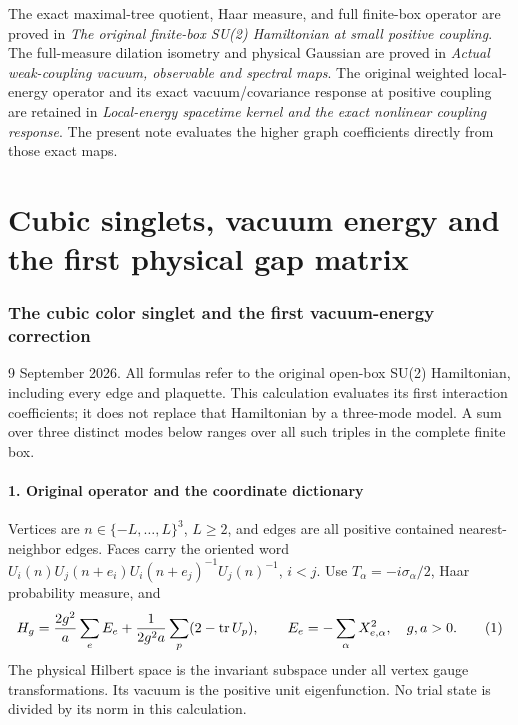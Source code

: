 \documentclass[
  11pt,
]{article}
\begin{document}
The exact maximal-tree quotient, Haar measure, and full finite-box
operator are proved in \emph{The original finite-box SU(2) Hamiltonian
at small positive coupling}. The full-measure dilation isometry and
physical Gaussian are proved in \emph{Actual weak-coupling vacuum,
observable and spectral maps}. The original weighted local-energy
operator and its exact vacuum/covariance response at positive coupling
are retained in \emph{Local-energy spacetime kernel and the exact
nonlinear coupling response}. The present note evaluates the higher
graph coefficients directly from those exact maps.

\clearpage
\part{Cubic singlets, vacuum energy and the first physical gap matrix}
\section{The cubic color singlet and the first vacuum-energy
correction}\label{weak-coupling-part-15-the-cubic-color-singlet-and-the-first-vacuum-energy-correction}

9 September 2026. All formulas refer to the original open-box SU(2)
Hamiltonian, including every edge and plaquette. This calculation
evaluates its first interaction coefficients; it does not replace that
Hamiltonian by a three-mode model. A sum over three distinct modes below
ranges over all such triples in the complete finite box.

\subsection{1. Original operator and the coordinate
dictionary}\label{weak-coupling-part-15-original-operator-and-the-coordinate-dictionary}

Vertices are \(n\in\{-L,\ldots,L\}^3\), \(L\ge2\), and edges are all
positive contained nearest-neighbor edges. Faces carry the oriented word
\(U_i(n)U_j(n+e_i)U_i(n+e_j)^{-1}U_j(n)^{-1}\), \(i<j\). Use
\(T_\alpha=-i\sigma_\alpha/2\), Haar probability measure, and \[
 H_g={2g^2\over a}\sum_e E_e+
       {1\over2g^2a}\sum_p(2-\operatorname{tr}U_p),\qquad
 E_e=-\sum_\alpha X_{e,\alpha}^2,\quad g,a>0.
 \tag{1}
\] The physical Hilbert space is the invariant subspace under all vertex
gauge transformations. Its vacuum is the positive unit eigenfunction. No
trial state is divided by its norm in this calculation.
\end{document}
